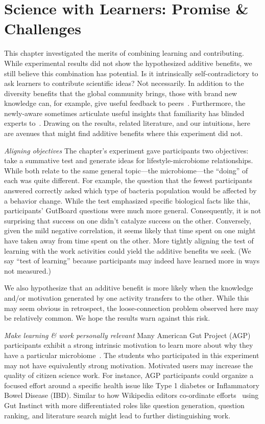 \section{Science with Learners: Promise \& Challenges}
This chapter investigated the merits of combining learning and contributing. While experimental results did not show the hypothesized additive benefits, we still believe this combination has potential. Is it intrinsically self-contradictory to ask learners to contribute scientific ideas? Not necessarily. In addition to the diversity benefits that the global community brings, those with brand new knowledge can, for example, give useful feedback to peers~\cite{Kulkarni2013peer}. Furthermore, the newly-aware sometimes articulate useful insights that familiarity has blinded experts to~\cite{Hinds1999}. Drawing on the results, related literature, and our intuitions, here are avenues that might find additive benefits where this experiment did not.

\textit{Aligning objectives}
The chapter’s experiment gave participants two objectives: take a summative test and generate ideas for lifestyle-microbiome relationships. While both relate to the same general topic---the microbiome---the “doing” of each was quite different. For example, the question that the fewest participants answered correctly asked which type of bacteria population would be affected by a behavior change. While the test emphasized specific biological facts like this, participants’ GutBoard questions were much more general. Consequently, it is not surprising that success on one didn’t catalyze success on the other. Conversely, given the mild negative correlation, it seems likely that time spent on one might have taken away from time spent on the other. More tightly aligning the test of learning with the work activities could yield the additive benefits we seek. (We say “test of learning” because participants may indeed have learned more in ways not measured.) 

We also hypothesize that an additive benefit is more likely when the knowledge and/or motivation generated by one activity transfers to the other. While this may seem obvious in retrospect, the loose-connection problem observed here may be relatively common. We hope the results warn against this risk.

\textit{Make learning \& work personally relevant}
Many American Gut Project (AGP) participants exhibit a strong intrinsic motivation to learn more about why they have a particular microbiome~\cite{Debelius2016}. The students who participated in this experiment may not have equivalently strong motivation. Motivated users may increase the quality of citizen science work. For instance, AGP participants could organize a focused effort around a specific health issue like Type 1 diabetes or Inflammatory Bowel Disease (IBD). Similar to how Wikipedia editors co-ordinate efforts~\cite{Krieger2009} using Gut Instinct with more differentiated roles like question generation, question ranking, and literature search might lead to further distinguishing work.


